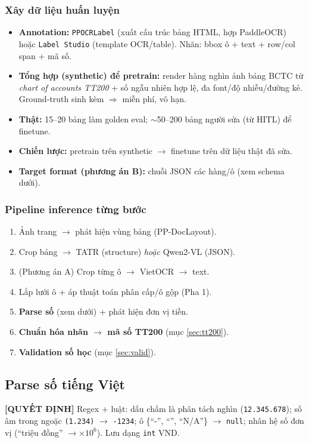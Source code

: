 \documentclass[11pt,a4paper]{article}
\newcommand{\dec}[1]{\textbf{\color{fsgreen!60!black}[QUYẾT ĐỊNH]} #1}
\begin{document}
\subsubsection{Xây dữ liệu huấn luyện}
\begin{itemize}
  \item \textbf{Annotation:} \texttt{PPOCRLabel} (xuất cấu trúc bảng HTML, hợp PaddleOCR) hoặc \texttt{Label Studio} (template OCR/table). Nhãn: bbox ô + text + row/col span + mã số.
  \item \textbf{Tổng hợp (synthetic) để pretrain:} render hàng nghìn ảnh bảng BCTC từ \emph{chart of accounts TT200} + số ngẫu nhiên hợp lệ, đa font/độ nhiễu/đường kẻ. Ground-truth sinh kèm $\Rightarrow$ miễn phí, vô hạn.
  \item \textbf{Thật:} 15--20 bảng làm golden eval; $\sim$50--200 bảng người sửa (từ HITL) để finetune.
  \item \textbf{Chiến lược:} pretrain trên synthetic $\rightarrow$ finetune trên dữ liệu thật đã sửa.
  \item \textbf{Target format (phương án B):} chuỗi JSON các hàng/ô (xem schema dưới).
\end{itemize}

\subsubsection{Pipeline inference từng bước}
\begin{enumerate}
  \item Ảnh trang $\rightarrow$ phát hiện vùng bảng (PP-DocLayout).
  \item Crop bảng $\rightarrow$ TATR (structure) \emph{hoặc} Qwen2-VL (JSON).
  \item (Phương án A) Crop từng ô $\rightarrow$ VietOCR $\rightarrow$ text.
  \item Lắp lưới ô + áp thuật toán phân cấp/ô gộp (Pha 1).
  \item \textbf{Parse số} (xem dưới) + phát hiện đơn vị tiền.
  \item \textbf{Chuẩn hóa nhãn $\rightarrow$ mã số TT200} (mục \ref{sec:tt200}).
  \item \textbf{Validation số học} (mục \ref{sec:valid}).
\end{enumerate}

\subsection{Parse số tiếng Việt}
\begin{quyetdinh}
\dec{} Regex + luật: dấu chấm là phân tách nghìn (\texttt{12.345.678}); số âm trong ngoặc \texttt{(1.234)} $\rightarrow$ \texttt{-1234}; ô \{``-'', ``'', ``N/A''\} $\rightarrow$ \texttt{null}; nhân hệ số đơn vị (``triệu đồng'' $\rightarrow \times 10^6$). Lưu dạng \texttt{int} VND.
\end{quyetdinh}
\end{document}
